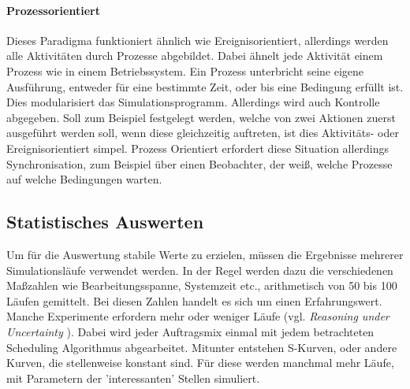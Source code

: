 \paragraph{Prozessorientiert}
Dieses Paradigma funktioniert ähnlich wie Ereignisorientiert, allerdings werden alle Aktivitäten durch Prozesse abgebildet. Dabei ähnelt jede Aktivität einem Prozess wie in einem Betriebssystem. Ein Prozess unterbricht seine eigene Ausführung, entweder für eine bestimmte Zeit, oder bis eine Bedingung erfüllt ist.\\
Dies modularisiert das Simulationsprogramm. Allerdings wird auch Kontrolle abgegeben. Soll zum Beispiel festgelegt werden, welche von zwei Aktionen zuerst ausgeführt werden soll, wenn diese gleichzeitig auftreten, ist dies Aktivitäts- oder Ereignisorientiert simpel. Prozess Orientiert erfordert diese Situation allerdings Synchronisation, zum Beispiel über einen Beobachter, der weiß, welche Prozesse auf welche Bedingungen warten.


\subsection{Statistisches Auswerten}
Um für die Auswertung stabile Werte zu erzielen, müssen die Ergebnisse mehrerer Simulationsläufe verwendet werden. In der Regel werden dazu die verschiedenen Maßzahlen wie Bearbeitungsspanne, Systemzeit etc., arithmetisch von 50 bis 100 Läufen gemittelt. Bei diesen Zahlen handelt es sich um einen Erfahrungswert. Manche Experimente erfordern mehr oder weniger Läufe (vgl. \emph{Reasoning under Uncertainty} \cite{SimUncertainty}). Dabei wird jeder Auftragsmix einmal mit jedem betrachteten Scheduling Algorithmus abgearbeitet. Mitunter entstehen S-Kurven, oder andere Kurven, die stellenweise konstant sind. Für diese werden manchmal mehr Läufe, mit Parametern der 'interessanten' Stellen simuliert.



